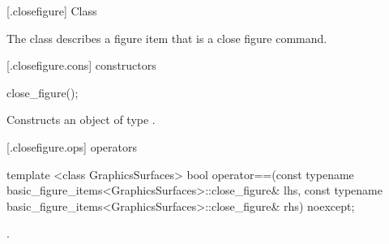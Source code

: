  [\iotwod.closefigure] {Class }%

\pnum
{}
The class  describes a figure item that is a close figure command.

 [\iotwod.closefigure.cons] { constructors}%

%
\begin{itemdecl}
close_figure();
\end{itemdecl}
\begin{itemdescr}
\pnum
\effects
Constructs an object of type .
\end{itemdescr}

 [\iotwod.closefigure.ops]{ operators}%

%
\begin{itemdecl}
template <class GraphicsSurfaces>
bool operator==(const typename basic_figure_items<GraphicsSurfaces>::close_figure& lhs,
  const typename basic_figure_items<GraphicsSurfaces>::close_figure& rhs) noexcept;
\end{itemdecl}
\begin{itemdescr}
\pnum
\returns
{}.
\end{itemdescr}
